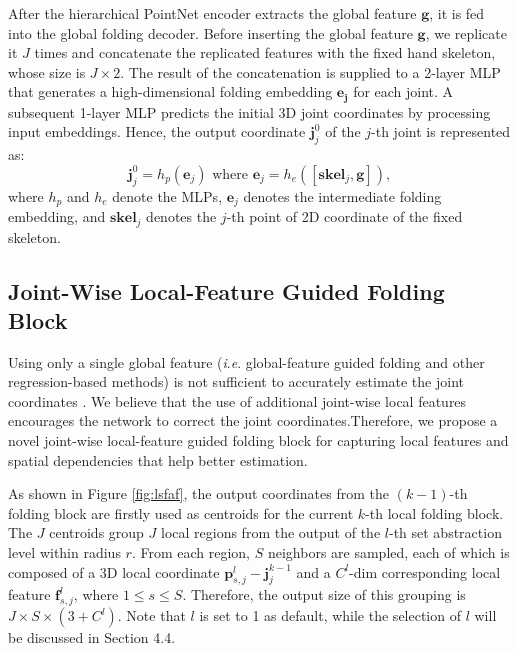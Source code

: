 \documentclass[10pt,twocolumn,letterpaper]{article}
\begin{document}
After the hierarchical PointNet encoder extracts the global feature $\textbf{g}$, it is fed into the global folding decoder. Before inserting the global feature $\textbf{g}$, we replicate it $J$ times and concatenate the replicated features with the fixed hand skeleton, whose size is $J \times 2$. The result of the concatenation is supplied to a 2-layer MLP that generates a high-dimensional folding embedding $\mathbf{e_j}$ for each joint. A subsequent 1-layer MLP predicts the initial 3D joint coordinates by processing input embeddings. Hence, the output coordinate $\textbf{j}^0_j$ of the $j$-th joint is represented as:
\begin{equation}
\textbf{j}^0_j = h_p(\textbf{e}_j) \text{  where  } \textbf{e}_j=h_e([\textbf{skel}_j, \textbf{g}]),
\end{equation} 
where $h_p$ and $h_e$ denote the MLPs, $\textbf{e}_j$ denotes the intermediate folding embedding, and $\textbf{skel}_j$ denotes the $j$-th point of 2D coordinate of the fixed skeleton.








\subsection{Joint-Wise Local-Feature Guided Folding Block}
Using only a single global feature (\textit{i}.\textit{e}. global-feature guided folding and other regression-based methods) is not sufficient to accurately estimate the joint coordinates . We believe that the use of additional joint-wise local features encourages the network to correct the joint coordinates.Therefore, we propose a novel joint-wise local-feature guided folding block for capturing local features and spatial dependencies that help better estimation.

As shown in Figure \ref{fig:lsfaf}, the output coordinates from the $(k-1)$-th folding block are firstly used as centroids for the current $k$-th local folding block. The $J$ centroids group $J$ local regions from the output of the $l$-th set abstraction level within radius $r$. From each region, $S$ neighbors are sampled, each of which is composed of a 3D local coordinate $\textbf{p}_{s,j}^l - \textbf{j}^{k-1}_j$ and a $C^l$-dim corresponding local feature $\textbf{f}_{s,j}^l$, where $1 \leq s \leq S$. 
Therefore, the output size of this grouping is $J \times S \times (3 + C^l)$. 
Note that $l$ is set to 1 as default, while the selection of $l$ will be discussed in Section 4.4.
\end{document}
